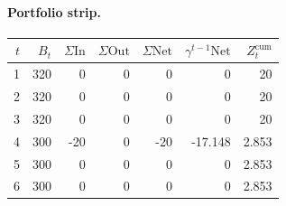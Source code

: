 \documentclass[12pt, a4paper]{article}
\begin{document}
\paragraph{Portfolio strip.}
\begin{center}
\begin{tabular}{rrrrrrr}
\toprule
$t$ & $B_t$ & $\Sigma\mathrm{In}$ & $\Sigma\mathrm{Out}$ & $\Sigma\mathrm{Net}$ & $\gamma^{t-1}\mathrm{Net}$ & $Z_t^{\mathrm{cum}}$\\
\midrule
1 & 320 & 0 & 0 & 0 & 0 & 20 \\
2 & 320 & 0 & 0 & 0 & 0 & 20 \\
3 & 320 & 0 & 0 & 0 & 0 & 20 \\
4 & 300 & -20 & 0 & -20 & -17.148 & 2.853 \\
5 & 300 & 0 & 0 & 0 & 0 & 2.853 \\
6 & 300 & 0 & 0 & 0 & 0 & 2.853 \\
\bottomrule
\end{tabular}
\end{center}
\end{document}
